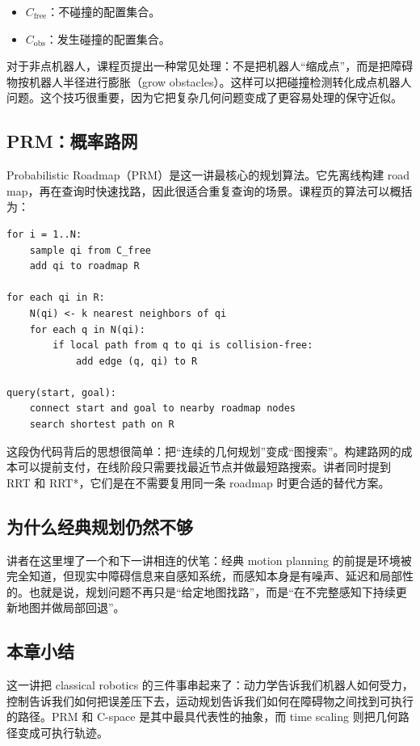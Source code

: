\documentclass[a4paper]{article}
\begin{document}
\begin{itemize}
  \item \(C_{\mathrm{free}}\)：不碰撞的配置集合。
  \item \(C_{\mathrm{obs}}\)：发生碰撞的配置集合。
\end{itemize}

对于非点机器人，课程页提出一种常见处理：不是把机器人“缩成点”，而是把障碍物按机器人半径进行膨胀（grow obstacles）。这样可以把碰撞检测转化成点机器人问题。这个技巧很重要，因为它把复杂几何问题变成了更容易处理的保守近似。

\subsection{PRM：概率路网}
Probabilistic Roadmap（PRM）是这一讲最核心的规划算法。它先离线构建 road map，再在查询时快速找路，因此很适合重复查询的场景。课程页的算法可以概括为：

\begin{lstlisting}[caption={PRM 的构建与查询逻辑（教学性伪代码）}]
for i = 1..N:
    sample qi from C_free
    add qi to roadmap R

for each qi in R:
    N(qi) <- k nearest neighbors of qi
    for each q in N(qi):
        if local path from q to qi is collision-free:
            add edge (q, qi) to R

query(start, goal):
    connect start and goal to nearby roadmap nodes
    search shortest path on R
\end{lstlisting}

这段伪代码背后的思想很简单：把“连续的几何规划”变成“图搜索”。构建路网的成本可以提前支付，在线阶段只需要找最近节点并做最短路搜索。讲者同时提到 RRT 和 RRT*，它们是在不需要复用同一条 roadmap 时更合适的替代方案。

\subsection{为什么经典规划仍然不够}
讲者在这里埋了一个和下一讲相连的伏笔：经典 motion planning 的前提是环境被完全知道，但现实中障碍信息来自感知系统，而感知本身是有噪声、延迟和局部性的。也就是说，规划问题不再只是“给定地图找路”，而是“在不完整感知下持续更新地图并做局部回退”。

\subsection{本章小结}
这一讲把 classical robotics 的三件事串起来了：动力学告诉我们机器人如何受力，控制告诉我们如何把误差压下去，运动规划告诉我们如何在障碍物之间找到可执行的路径。PRM 和 C-space 是其中最具代表性的抽象，而 time scaling 则把几何路径变成可执行轨迹。
\end{document}
